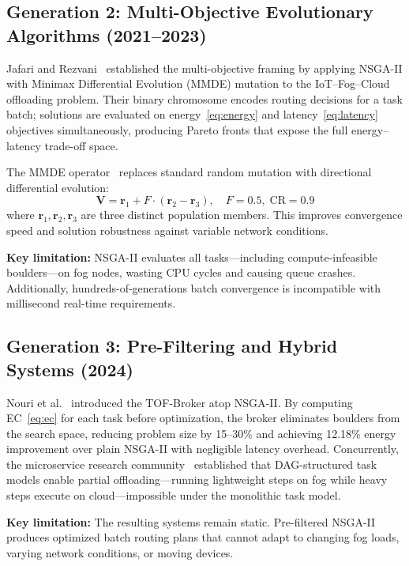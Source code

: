 \documentclass[12pt,a4paper]{article}
\begin{document}
\subsection{Generation 2: Multi-Objective Evolutionary Algorithms (2021--2023)}

Jafari and Rezvani~\cite{jafari2021} established the multi-objective framing by
applying NSGA-II with Minimax Differential Evolution (MMDE) mutation to the
IoT--Fog--Cloud offloading problem. Their binary chromosome encodes routing
decisions for a task batch; solutions are evaluated on energy~\eqref{eq:energy}
and latency~\eqref{eq:latency} objectives simultaneously, producing Pareto fronts
that expose the full energy--latency trade-off space.

The MMDE operator~\cite{jafari2021} replaces standard random mutation with
directional differential evolution:
\begin{equation}
  \mathbf{V} = \mathbf{r}_1 + F \cdot (\mathbf{r}_2 - \mathbf{r}_3),
  \quad F = 0.5,\; \mathrm{CR} = 0.9
  \label{eq:mmde}
\end{equation}
where $\mathbf{r}_1, \mathbf{r}_2, \mathbf{r}_3$ are three distinct population
members. This improves convergence speed and solution robustness against
variable network conditions.

\textbf{Key limitation:} NSGA-II evaluates all tasks---including
compute-infeasible boulders---on fog nodes, wasting CPU cycles and causing queue
crashes. Additionally, hundreds-of-generations batch convergence is incompatible
with millisecond real-time requirements.

\subsection{Generation 3: Pre-Filtering and Hybrid Systems (2024)}

Nouri et al.~\cite{nouri2024tof} introduced the TOF-Broker atop NSGA-II.
By computing EC~\eqref{eq:ec} for each task before optimization, the broker
eliminates boulders from the search space, reducing problem size by 15--30\% and
achieving 12.18\% energy improvement over plain NSGA-II with negligible latency
overhead. Concurrently, the microservice research community~\cite{li2025microservice}
established that DAG-structured task models enable partial offloading---running
lightweight steps on fog while heavy steps execute on cloud---impossible under the
monolithic task model.

\textbf{Key limitation:} The resulting systems remain static. Pre-filtered
NSGA-II produces optimized batch routing plans that cannot adapt to changing
fog loads, varying network conditions, or moving devices.
\end{document}

